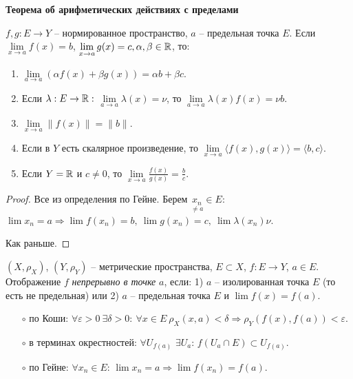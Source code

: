 \begin{theorem}
    \textbf{Теорема об арифметических действиях с пределами}

    $f, g:E\rightarrow Y$ – нормированное пространство, $a$ – предельная точка $E$. Если $\lim\limits_{x\rightarrow a}f(x)=b$, $\lim\limits_{x\rightarrow a}g(x)=c, \alpha, \beta\in \mathbb{R}$, то:
    \begin{enumerate}
        \item $\lim\limits_{a\rightarrow a}(\alpha f(x)+\beta g(x))=\alpha b+\beta c$.

        \item Если $\lambda :E\rightarrow \mathbb{R}:$ $\lim\limits_{a\rightarrow a}\lambda(x)=\nu$, то $\lim\limits_{a\rightarrow a}\lambda(x)f(x)=\nu b$.

        \item $\lim\limits_{x\rightarrow a}\|f(x)\|=\|b\|$.

        \item Если в $Y$ есть скалярное произведение, то $\lim\limits_{x\rightarrow a}\langle f(x),g(x)\rangle =\langle b, c\rangle$.

        \item Если $Y=\mathbb{R}$ и $c\neq 0$, то $\lim\limits_{x\rightarrow a}\frac{f(x)}{g(x)}=\frac{b}{c}$.
    \end{enumerate}
\end{theorem}

\begin{proof}
    Все из определения по Гейне. Берем $\underset{\neq a}{x_n}\in E$: $\lim x_n=a\Rightarrow \lim f(x_n)=b,\ \lim g(x_n)=c,\ \lim\lambda(x_n)\nu$.

    Как раньше.
\end{proof}

\begin{definition}
    $(X, \rho_X)$, $(Y, \rho_Y)$ – метрические пространства, $E\subset X$, $f:E\rightarrow Y$, $a\in E$. Отображение $f$ \textit{непрерывно в точке} $a$, если: 1) $a$ – изолированная точка $E$ (то есть не предельная) или 2) $a$ – предельная точка $E$ и $\lim f(x)=f(a)$.

    \begin{enumerate}
        \item[$\circ$] по Коши: $\forall \varepsilon>0\ \exists \delta >0:\ \forall x\in E\ \rho_X(x, a)<\delta\Rightarrow \rho_Y(f(x), f(a))<\varepsilon$.
        \item[$\circ$] в терминах окрестностей: $\forall U_{f(a)}$  $\exists U_a$: $f(U_a\cap E)\subset U_{f(a)}$.
        \item[$\circ$] по Гейне: $\forall x_n\in E$: $\lim x_n =a\Rightarrow \lim f(x_n)=f(a)$. 
    \end{enumerate}
\end{definition}

